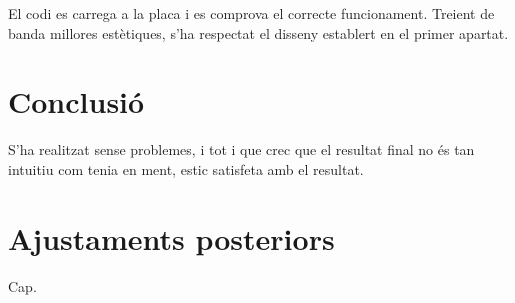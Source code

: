 El codi es carrega a la placa i es comprova el correcte funcionament.
Treient de banda millores estètiques, s'ha respectat el disseny establert en el primer apartat. 

\section{Conclusió}

S'ha realitzat sense problemes, i tot i que crec que el resultat final no
és tan intuitiu com tenia en ment, estic satisfeta amb el resultat.

\section{Ajustaments posteriors}

Cap.
